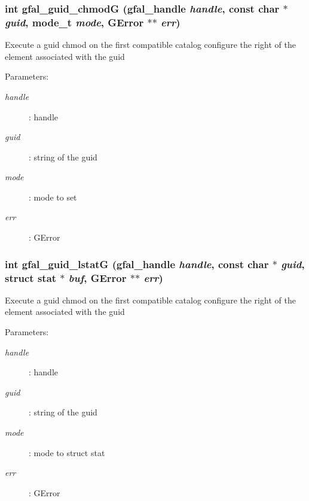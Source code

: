 \subsubsection{\setlength{\rightskip}{0pt plus 5cm}int gfal\_\-guid\_\-chmod\-G (gfal\_\-handle {\em handle}, const char $\ast$ {\em guid}, mode\_\-t {\em mode}, GError $\ast$$\ast$ {\em err})}\label{gfal__common__guid_8c_34d01b3a64910eddc1d7988c6b1b2ae4}


Execute a guid chmod on the first compatible catalog configure the right of the element associated with the guid \begin{Desc}
\item[Parameters:]
\begin{description}
\item[{\em handle}]: handle \item[{\em guid}]: string of the guid \item[{\em mode}]: mode to set \item[{\em err}]: GError \end{description}
\end{Desc}
\subsubsection{\setlength{\rightskip}{0pt plus 5cm}int gfal\_\-guid\_\-lstat\-G (gfal\_\-handle {\em handle}, const char $\ast$ {\em guid}, struct stat $\ast$ {\em buf}, GError $\ast$$\ast$ {\em err})}\label{gfal__common__guid_8c_c36e690e0d3acbd553d9466fa14dcff4}


Execute a guid chmod on the first compatible catalog configure the right of the element associated with the guid \begin{Desc}
\item[Parameters:]
\begin{description}
\item[{\em handle}]: handle \item[{\em guid}]: string of the guid \item[{\em mode}]: mode to struct stat \item[{\em err}]: GError \end{description}
\end{Desc}
